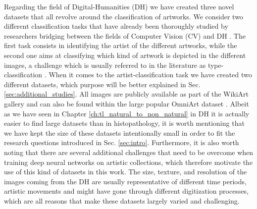 Regarding the field of Digital-Humanities (DH) we have created three novel datasets that all revolve around the classification of artworks. We consider two different classification tasks that have already been thoroughly studied by researchers bridging between the fields of Computer Vision (CV) and DH \cite{mensink2014rijksmuseum,strezoski2017omniart,sabatelli2018deep}. The first task consists in identifying the artist of the different artworks, while the second one aims at classifying which kind of artwork is depicted in the different images, a challenge which is usually referred to in the literature as type-classification \cite{mensink2014rijksmuseum,sabatelli2018deep}. When it comes to the artist-classification task we have created two different datasets, which purpose will be better explained in Sec. \ref{sec:additional_studies}. All images are publicly available as part of the WikiArt gallery \cite{phillips2011wiki} and can also be found within the large popular OmniArt dataset \cite{strezoski2018omniart}. Albeit as we have seen in Chapter \ref{ch:tl_natural_to_non_natural} in DH it is actually easier to find large datasets than in histopathology, it is worth mentioning that we have kept the size of these datasets intentionally small in order to fit the research questions introduced in Sec. \ref{sec:intro}. Furthermore, it is also worth noting that there are several additional challenges that need to be overcome when training deep neural networks on artistic collections, which therefore motivate the use of this kind of datasets in this work. The size, texture, and resolution of the images coming from the DH are usually representative of different time periods, artistic movements and might have gone through different digitization processes, which are all reasons that make these datasets largely varied and challenging.



